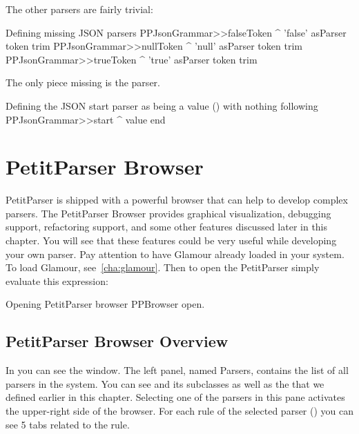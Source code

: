 \documentclass[a4paper,10pt,twoside]{book}
\begin{document}
The other parsers are fairly trivial:

\begin{script}{Defining missing JSON parsers}
PPJsonGrammar>>falseToken
  ^ 'false' asParser token trim
PPJsonGrammar>>nullToken
  ^ 'null' asParser token trim
PPJsonGrammar>>trueToken
  ^ 'true' asParser token trim
\end{script}

The only piece missing is the  parser.

\begin{script}{Defining the JSON start parser as being a value () with nothing following}
PPJsonGrammar>>start
  ^ value end
\end{script}


\section{PetitParser Browser}

PetitParser is shipped with a powerful browser that can help to develop complex parsers.
The PetitParser Browser provides graphical visualization, debugging support, refactoring support, and some other features discussed later in this chapter.
You will see that these features could be very useful while developing your own parser.
Pay attention to have Glamour already loaded in your system. To load Glamour, see~\ref{cha:glamour}. Then to open the PetitParser simply evaluate this expression:
\begin{script}{Opening PetitParser browser}
PPBrowser open.
\end{script}

\subsection{PetitParser Browser Overview}

In  you can see the  window.
The left panel, named Parsers, contains the list of all parsers in the system.
You can see  and its subclasses as well as the  that we defined earlier in this chapter.
Selecting one of the parsers in this pane activates the upper-right side of the browser.
For each rule of the selected parser (\eg {}) you can see 5 tabs related to the rule.
\end{document}
